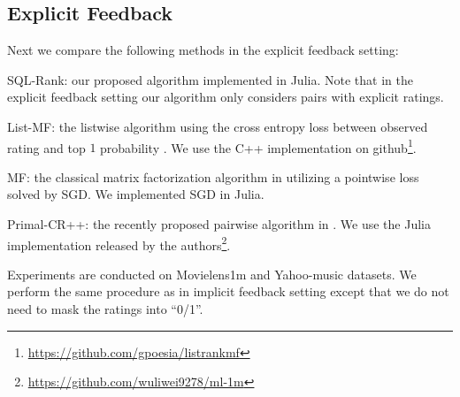\documentclass{article}
\begin{document}
\subsection{Explicit Feedback}
Next we compare the following methods in the explicit feedback setting: 
\begin{compactitem}
    \item SQL-Rank: our proposed algorithm implemented in Julia. Note that in the explicit feedback setting our algorithm
    only considers pairs with explicit ratings. 
    \item List-MF: the listwise algorithm using the cross entropy loss between observed rating and top $1$ probability \cite{shi2010list}. We use the C++ implementation on github\footnote{\url{https://github.com/gpoesia/listrankmf}}.
    \item MF: the classical matrix factorization algorithm in \cite{koren2008factorization} utilizing a pointwise loss solved by SGD. We implemented SGD in Julia. 
    \item Primal-CR++: the recently proposed pairwise algorithm in \cite{wu2017large}. We use the Julia implementation released by the authors\footnote{\url{https://github.com/wuliwei9278/ml-1m}}.
\end{compactitem}

Experiments are conducted on Movielens1m and Yahoo-music datasets. We perform the same procedure as in implicit feedback setting except that we do not need to mask the ratings into ``0/1''. 
\end{document}

